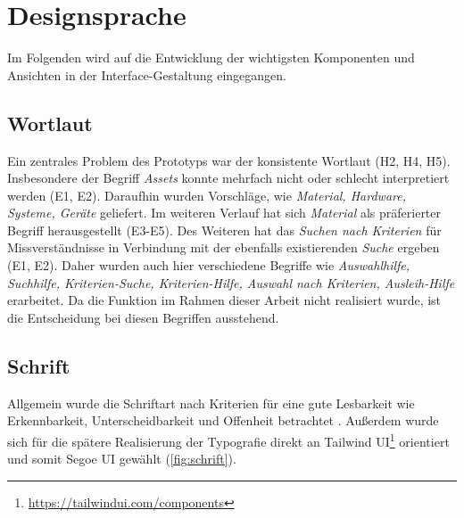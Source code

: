 \section{Designsprache}

Im Folgenden wird auf die Entwicklung der wichtigsten Komponenten und Ansichten
in der Interface-Gestaltung eingegangen.

\subsection{Wortlaut}
Ein zentrales Problem des Prototyps war der konsistente Wortlaut (H2, H4, H5).
Insbesondere der Begriff \textit{Assets} konnte mehrfach nicht oder schlecht
interpretiert werden (E1, E2). Daraufhin wurden Vorschläge, wie
\textit{Material, Hardware, Systeme, Geräte} geliefert. Im weiteren Verlauf hat sich
\textit{Material} als präferierter Begriff herausgestellt (E3-E5). Des Weiteren
hat das \textit{Suchen nach Kriterien} für Missverständnisse in Verbindung mit
der ebenfalls existierenden \textit{Suche} ergeben (E1, E2). Daher wurden auch
hier verschiedene Begriffe wie
\textit{Auswahlhilfe, Suchhilfe, Kriterien-Suche, Kriterien-Hilfe, Auswahl nach Kriterien, Ausleih-Hilfe}
erarbeitet. Da die Funktion im Rahmen dieser Arbeit nicht realisiert wurde, ist die Entscheidung bei
diesen Begriffen ausstehend.

\subsection{Schrift}
Allgemein wurde die Schriftart nach Kriterien für eine gute Lesbarkeit wie
Erkennbarkeit, Unterscheidbarkeit und Offenheit betrachtet
\cite{kommunikationsdesign_leserlichinfo}. Außerdem wurde sich für die spätere
Realisierung der Typografie direkt an Tailwind
UI\footnote{\url{https://tailwindui.com/components}} orientiert und somit Segoe
UI gewählt (\ref{fig:schrift}).

